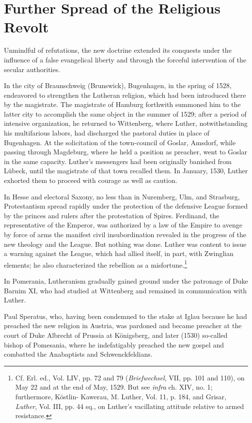 \section{Further Spread of the Religious Revolt}

Unmindful of refutations, the new doctrine extended its conquests
under the influence of a false evangelical liberty and through the
forceful intervention of the secular authorities.

In the city of Braunschweig (Brunswick), Bugenhagen, in the
spring of 1528, endeavored to strengthen the Lutheran religion,
which had been introduced there by the magistrate. The magistrate
of Hamburg forthwith summoned him to the latter city to accomplish the
same object in the summer of 1529; after a period of intensive
organization, he returned to Wittenberg, where Luther, notwithstanding
his multifarious labors, had discharged the pastoral duties
in place of Bugenhagen. At the solicitation of the town-council of
Goslar, Amsdorf, while passing through Magdeburg, where he held
a position as preacher, went to Goslar in the same capacity. Luther’s
messengers had been originally banished from Lübeck, until the magistrate
of that town recalled them. In January, 1530, Luther exhorted
them to proceed with courage as well as caution.

In Hesse and electoral Saxony, no less than in Nuremberg, Ulm,
and Strasburg, Protestantism spread rapidly under the protection of
the defensive League formed by the princes and rulers after the protestation
of Spires. Ferdinand, the representative of the Emperor,
was authorized by a law of the Empire to avenge by force of arms the
manifest civil insubordination revealed in the progress of the new theology
and the League. But nothing was done. Luther was content to
issue a warning against the League, which had allied itself, in part,
with Zwinglian elements; he also characterized the rebellion as a
misfortune.\footnote
{Cf. Erl. ed., Vol. LIV, pp. 72 and 79 (\textit{Briefwechsel}, VII, pp. 101 and 110), on May
22 and at the end of May, 1529. But see \textit{infra} ch. XIV, no. 1; furthermore, Köstlin-
Kawerau, M. Luther, Vol. 11, p. 184, and Grisar, \textit{Luther}, Vol. III, pp. 44 sq., on Luther’s
vacillating attitude relative to armed resistance.}

In Pomerania, Lutheranism gradually gained ground under the
patronage of Duke Barnim XI, who had studied at Wittenberg
and remained in communication with Luther.

Paul Speratus, who, having been condemned to the stake at Iglau
because he had preached the new religion in Austria, was pardoned
and became preacher at the court of Duke Albrecht of Prussia at
Königsberg, and later (1530) so-called bishop of Pomesania, where
he indefatigably preached the new gospel and combatted the Anabaptists
and Schwenckfeldians.

